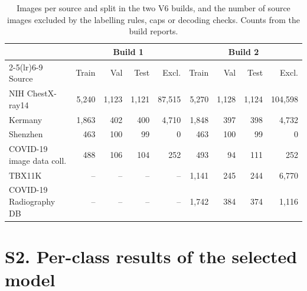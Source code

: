 \documentclass[12pt]{article}
\begin{document}
\begin{table}[ht]
\centering
\caption{Images per source and split in the two V6 builds, and the number of source images excluded by the labelling rules, caps or decoding checks. Counts from the build reports.}
\label{tab:sourcesplit}
\small
\begin{tabular}{@{}lrrrrrrrr@{}}
\toprule
 & \multicolumn{4}{c}{Build 1} & \multicolumn{4}{c}{Build 2} \\
\cmidrule(lr){2-5}\cmidrule(lr){6-9}
Source & Train & Val & Test & Excl. & Train & Val & Test & Excl. \\
\midrule
NIH ChestX-ray14              & 5,240 & 1,123 & 1,121 & 87,515 & 5,270 & 1,128 & 1,124 & 104,598 \\
Kermany                       & 1,863 & 402   & 400   & 4,710  & 1,848 & 397   & 398   & 4,732 \\
Shenzhen                      & 463   & 100   & 99    & 0      & 463   & 100   & 99    & 0 \\
COVID-19 image data coll.     & 488   & 106   & 104   & 252    & 493   & 94    & 111   & 252 \\
TBX11K                        & --    & --    & --    & --     & 1,141 & 245   & 244   & 6,770 \\
COVID-19 Radiography DB       & --    & --    & --    & --     & 1,742 & 384   & 374   & 1,116 \\
\bottomrule
\end{tabular}
\end{table}

\section*{S2. Per-class results of the selected model}
\end{document}
